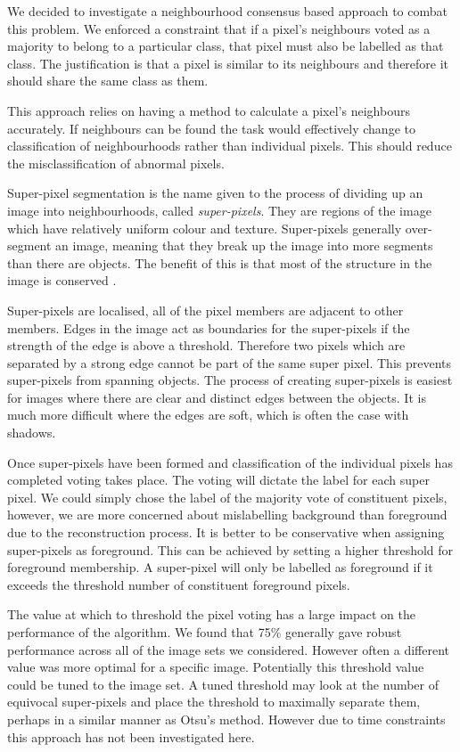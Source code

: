 \documentclass[12pt]{IIBproject}
\begin{document}
We decided to investigate a neighbourhood consensus based approach to combat this problem. We enforced a constraint that if a pixel's neighbours voted as a majority to belong to a particular class, that pixel must also be labelled as that class. The justification is that a pixel is similar to its neighbours and therefore it should share the same class as them. 

This approach relies on having a method to calculate a pixel's neighbours accurately. If neighbours can be found the task would effectively change to classification of neighbourhoods rather than individual pixels. This should reduce the misclassification of abnormal pixels.

Super-pixel segmentation is the name given to the process of dividing up an image into neighbourhoods, called \emph{super-pixels}. They are regions of the image which have relatively uniform colour and texture. Super-pixels generally over-segment an image, meaning that they break up the image into more segments than there are objects. The benefit of this is that most of the structure in the image is conserved \cite{RenMalik03}.  

Super-pixels are localised, all of the pixel members are adjacent to other members. Edges in the image act as boundaries for the super-pixels if the strength of the edge is above a threshold. Therefore two pixels which are separated by a strong edge cannot be part of the same super pixel. This prevents super-pixels from spanning objects. The process of creating super-pixels is easiest for images where there are clear and distinct edges between the objects. It is much more difficult where the edges are soft, which is often the case with shadows. 

Once super-pixels have been formed and classification of the individual pixels has completed voting takes place. The voting will dictate the label for each super pixel. We could simply chose the label of the majority vote of constituent pixels, however, we are more concerned about mislabelling background than foreground due to the reconstruction process. It is better to be conservative when assigning super-pixels as foreground. This can be achieved by setting a higher threshold for foreground membership. A super-pixel will only be labelled as foreground if it exceeds the threshold number of constituent foreground pixels.

The value at which to threshold the pixel voting has a large impact on the performance of the algorithm. We found that 75\% generally gave robust performance across all of the image sets we considered. However often a different value was more optimal for a specific image. Potentially this threshold value could be tuned to the image set. A tuned threshold may look at the number of equivocal super-pixels and place the threshold to maximally separate them, perhaps in a similar manner as Otsu's method. However due to time constraints this approach has not been investigated here. 
\end{document}
